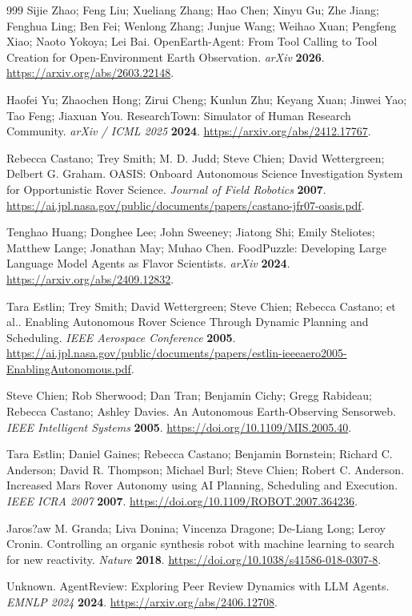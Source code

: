 \begin{thebibliography}{999}
Sijie Zhao; Feng Liu; Xueliang Zhang; Hao Chen; Xinyu Gu; Zhe Jiang; Fenghua Ling; Ben Fei; Wenlong Zhang; Junjue Wang; Weihao Xuan; Pengfeng Xiao; Naoto Yokoya; Lei Bai.
OpenEarth-Agent: From Tool Calling to Tool Creation for Open-Environment Earth Observation.
\emph{arXiv} \textbf{2026}.
\url{https://arxiv.org/abs/2603.22148}.

Haofei Yu; Zhaochen Hong; Zirui Cheng; Kunlun Zhu; Keyang Xuan; Jinwei Yao; Tao Feng; Jiaxuan You.
ResearchTown: Simulator of Human Research Community.
\emph{arXiv / ICML 2025} \textbf{2024}.
\url{https://arxiv.org/abs/2412.17767}.

Rebecca Castano; Trey Smith; M. D. Judd; Steve Chien; David Wettergreen; Delbert G. Graham.
OASIS: Onboard Autonomous Science Investigation System for Opportunistic Rover Science.
\emph{Journal of Field Robotics} \textbf{2007}.
\url{https://ai.jpl.nasa.gov/public/documents/papers/castano-jfr07-oasis.pdf}.

Tenghao Huang; Donghee Lee; John Sweeney; Jiatong Shi; Emily Steliotes; Matthew Lange; Jonathan May; Muhao Chen.
FoodPuzzle: Developing Large Language Model Agents as Flavor Scientists.
\emph{arXiv} \textbf{2024}.
\url{https://arxiv.org/abs/2409.12832}.

Tara Estlin; Trey Smith; David Wettergreen; Steve Chien; Rebecca Castano; et al..
Enabling Autonomous Rover Science Through Dynamic Planning and Scheduling.
\emph{IEEE Aerospace Conference} \textbf{2005}.
\url{https://ai.jpl.nasa.gov/public/documents/papers/estlin-ieeeaero2005-EnablingAutonomous.pdf}.

Steve Chien; Rob Sherwood; Dan Tran; Benjamin Cichy; Gregg Rabideau; Rebecca Castano; Ashley Davies.
An Autonomous Earth-Observing Sensorweb.
\emph{IEEE Intelligent Systems} \textbf{2005}.
\url{https://doi.org/10.1109/MIS.2005.40}.

Tara Estlin; Daniel Gaines; Rebecca Castano; Benjamin Bornstein; Richard C. Anderson; David R. Thompson; Michael Burl; Steve Chien; Robert C. Anderson.
Increased Mars Rover Autonomy using AI Planning, Scheduling and Execution.
\emph{IEEE ICRA 2007} \textbf{2007}.
\url{https://doi.org/10.1109/ROBOT.2007.364236}.

Jaros?aw M. Granda; Liva Donina; Vincenza Dragone; De-Liang Long; Leroy Cronin.
Controlling an organic synthesis robot with machine learning to search for new reactivity.
\emph{Nature} \textbf{2018}.
\url{https://doi.org/10.1038/s41586-018-0307-8}.

Unknown.
AgentReview: Exploring Peer Review Dynamics with LLM Agents.
\emph{EMNLP 2024} \textbf{2024}.
\url{https://arxiv.org/abs/2406.12708}.

\end{thebibliography}
